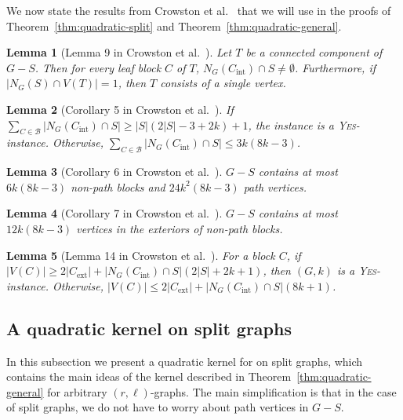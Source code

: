 \documentclass[
final
]{dmtcs-episciences}
\newtheorem{lemma}{Lemma}{\bfseries}{\itshape}
\begin{document}
We now state the results from Crowston et al.~\cite{crowston2013maximum} that we will use in the proofs of Theorem~\ref{thm:quadratic-split} and Theorem~\ref{thm:quadratic-general}.


\begin{lemma}[Lemma 9 in Crowston et al.~\cite{crowston2013maximum}]\label{Crow-Lemma-9}
Let $T$ be a connected component of $G -S$. Then for every leaf block $C$ of $T$, $N_G(C_{\text{int}}) \cap S \neq \emptyset$. Furthermore, if $|N_G(S) \cap V(T)|=1$, then $T$ consists of a single vertex.
\end{lemma}


\begin{lemma}[Corollary 5 in Crowston et al.~\cite{crowston2013maximum}]\label{Crow-Coro-5}
If $\sum_{C \in \mathcal{B}} |N_G(C_{\text{int}}) \cap S| \geq |S| (2|S| - 3 + 2k) + 1$, the instance is a \textsc{Yes}-instance. Otherwise, $\sum_{C \in \mathcal{B}} |N_G(C_{\text{int}}) \cap S| \leq 3k(8k-3)$.
\end{lemma}


\begin{lemma}[Corollary 6 in Crowston et al.~\cite{crowston2013maximum}]\label{Crow-Coro-6}
 $G-S$ contains at most $6k(8k-3)$ non-path blocks and $24k^2 (8k-3)$
path vertices.
\end{lemma}

\begin{lemma}[Corollary 7 in Crowston et al.~\cite{crowston2013maximum}]\label{Crow-Coro-7}
$G - S$ contains at most $12k(8k - 3)$ vertices in the exteriors of
non-path blocks.
\end{lemma}

\begin{lemma}[Lemma 14 in Crowston et al.~\cite{crowston2013maximum}]\label{Crow-Lemma-14}
For a block $C$, if $|V (C)| \geq 2|C_{\text{ext}} |+|N_G (C_{\text{int}}) \cap S|(2|S|+2k +1)$,
then $(G,k)$ is a \textsc{Yes}-instance. Otherwise, $|V (C)| \leq 2|C_{\text{ext}}|+|N_G (C_{\text{int}} ) \cap S|(8k+ 1)$.
\end{lemma}

\subsection{A quadratic kernel on split graphs}
\label{ap:quadratic-split}

In this subsection we present a quadratic kernel for {} on split graphs, which contains the main ideas of the kernel described in Theorem~\ref{thm:quadratic-general} for arbitrary $(r,\ell)$-graphs. The main simplification is that in the case of split graphs, we do not have to worry about path vertices in $G-S$.
\end{document}
